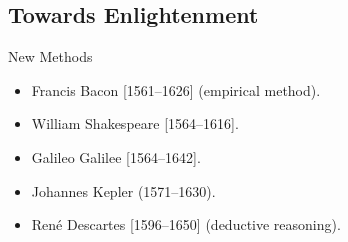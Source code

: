 \subsection{Towards Enlightenment}
\begin{frame}{New Methods}
	\begin{itemize}
		\item<1->Francis Bacon [1561--1626] (empirical method).
		\item<2->William Shakespeare [1564--1616].
		\item<3->Galileo Galilee [1564--1642].
		\item<4->Johannes Kepler (1571--1630).
		\item<5->Ren{\'e} Descartes [1596--1650] (deductive reasoning).
	\end{itemize}
\end{frame}

